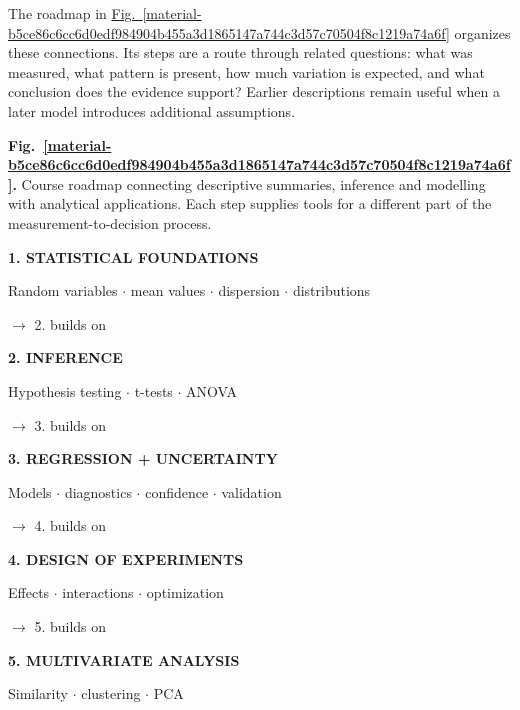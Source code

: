 \documentclass[11pt,a4paper]{article}
\begin{document}
The roadmap in \hyperref[material-b5ce86c6cc6d0edf984904b455a3d1865147a744c3d57c70504f8c1219a74a6f]{Fig.~\ref*{material-b5ce86c6cc6d0edf984904b455a3d1865147a744c3d57c70504f8c1219a74a6f}} organizes these connections. Its steps are a route through related questions: what was measured, what pattern is present, how much variation is expected, and what conclusion does the evidence support? Earlier descriptions remain useful when a later model introduces additional assumptions.


\par\medskip
\Needspace{10cm}
\label{material-b5ce86c6cc6d0edf984904b455a3d1865147a744c3d57c70504f8c1219a74a6f}
\noindent\textbf{Fig.~\ref*{material-b5ce86c6cc6d0edf984904b455a3d1865147a744c3d57c70504f8c1219a74a6f}.} Course roadmap connecting descriptive summaries, inference and modelling with analytical applications. Each step supplies tools for a different part of the measurement-to-decision process.\par\nopagebreak
\par\medskip\noindent\textcolor{pcd1}{\textbf{1. STATISTICAL FOUNDATIONS}}\par
Random variables \ensuremath{\cdot} mean values \ensuremath{\cdot} dispersion \ensuremath{\cdot} distributions

\par\noindent $\longrightarrow$ 2. builds on
\par\medskip\noindent\textcolor{pcd2}{\textbf{2. INFERENCE}}\par
Hypothesis testing \ensuremath{\cdot} t-tests \ensuremath{\cdot} ANOVA

\par\noindent $\longrightarrow$ 3. builds on
\par\medskip\noindent\textcolor{pcd3}{\textbf{3. REGRESSION + UNCERTAINTY}}\par
Models \ensuremath{\cdot} diagnostics \ensuremath{\cdot} confidence \ensuremath{\cdot} validation

\par\noindent $\longrightarrow$ 4. builds on
\par\medskip\noindent\textcolor{pcd4}{\textbf{4. DESIGN OF EXPERIMENTS}}\par
Effects \ensuremath{\cdot} interactions \ensuremath{\cdot} optimization

\par\noindent $\longrightarrow$ 5. builds on
\par\medskip\noindent\textcolor{pcd5}{\textbf{5. MULTIVARIATE ANALYSIS}}\par
Similarity \ensuremath{\cdot} clustering \ensuremath{\cdot} PCA
\end{document}
